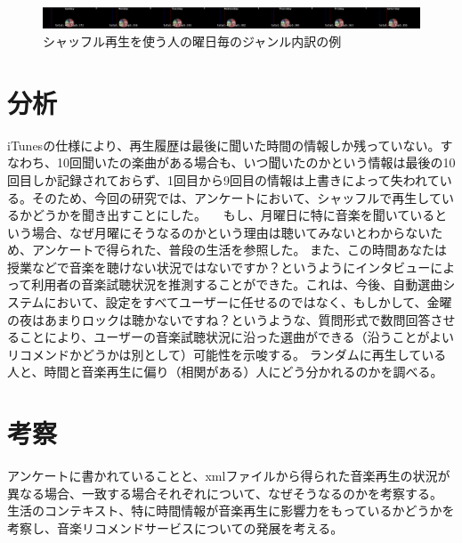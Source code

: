 \documentclass{jsarticle}
\begin{document}
\begin{figure}[h]
\begin{center}
\includegraphics[width=14cm]{taru_weekGenreRatio.jpg}
\caption{シャッフル再生を使う人の曜日毎のジャンル内訳の例}
\label{weekGenreMap_shuffle}
\end{center}
\end{figure}

\section{分析}
iTunesの仕様により、再生履歴は最後に聞いた時間の情報しか残っていない。すなわち、10回聞いたの楽曲がある場合も、いつ聞いたのかという情報は最後の10回目しか記録されておらず、1回目から9回目の情報は上書きによって失われている。そのため、今回の研究では、アンケートにおいて、シャッフルで再生しているかどうかを聞き出すことにした。
　もし、月曜日に特に音楽を聞いているという場合、なぜ月曜にそうなるのかという理由は聴いてみないとわからないため、アンケートで得られた、普段の生活を参照した。
また、この時間あなたは授業などで音楽を聴けない状況ではないですか？というようにインタビューによって利用者の音楽試聴状況を推測することができた。これは、今後、自動選曲システムにおいて、設定をすべてユーザーに任せるのではなく、もしかして、金曜の夜はあまりロックは聴かないですね？というような、質問形式で数問回答させることにより、ユーザーの音楽試聴状況に沿った選曲ができる（沿うことがよいリコメンドかどうかは別として）可能性を示唆する。
ランダムに再生している人と、時間と音楽再生に偏り（相関がある）人にどう分かれるのかを調べる。

\section{考察}
アンケートに書かれていることと、xmlファイルから得られた音楽再生の状況が異なる場合、一致する場合それぞれについて、なぜそうなるのかを考察する。
生活のコンテキスト、特に時間情報が音楽再生に影響力をもっているかどうかを考察し、音楽リコメンドサービスについての発展を考える。
\end{document}
